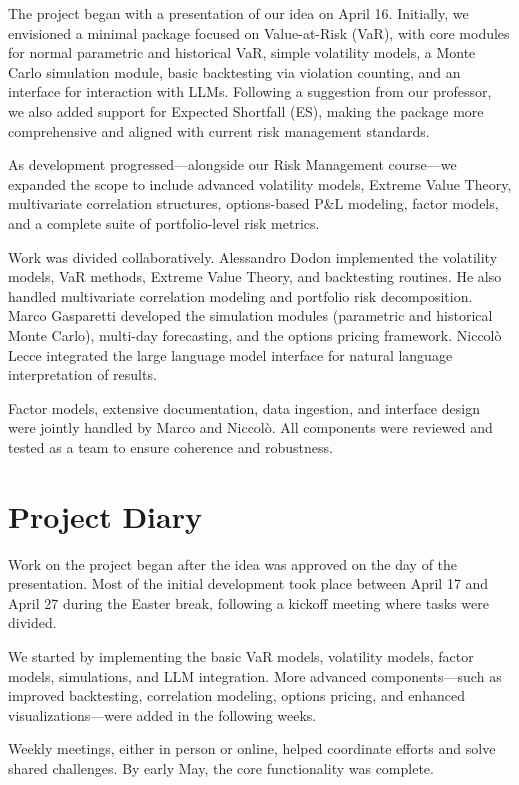 \documentclass{article}
\begin{document}
The project began with a presentation of our idea on April 16. Initially, we envisioned a minimal package focused on Value-at-Risk (VaR), with core modules for normal parametric and historical VaR, simple volatility models, a Monte Carlo simulation module, basic backtesting via violation counting, and an interface for interaction with LLMs. Following a suggestion from our professor, we also added support for Expected Shortfall (ES), making the package more comprehensive and aligned with current risk management standards.

As development progressed—alongside our Risk Management course—we expanded the scope to include advanced volatility models, Extreme Value Theory, multivariate correlation structures, options-based P\&L modeling, factor models, and a complete suite of portfolio-level risk metrics.

Work was divided collaboratively. Alessandro Dodon implemented the volatility models, VaR methods, Extreme Value Theory, and backtesting routines. He also handled multivariate correlation modeling and portfolio risk decomposition. Marco Gasparetti developed the simulation modules (parametric and historical Monte Carlo), multi-day forecasting, and the options pricing framework. Niccolò Lecce integrated the large language model interface for natural language interpretation of results.

Factor models, extensive documentation, data ingestion, and interface design were jointly handled by Marco and Niccolò. All components were reviewed and tested as a team to ensure coherence and robustness.


\section{Project Diary}

Work on the project began after the idea was approved on the day of the presentation. Most of the initial development took place between April 17 and April 27 during the Easter break, following a kickoff meeting where tasks were divided.

We started by implementing the basic VaR models, volatility models, factor models, simulations, and LLM integration. More advanced components—such as improved backtesting, correlation modeling, options pricing, and enhanced visualizations—were added in the following weeks.

Weekly meetings, either in person or online, helped coordinate efforts and solve shared challenges. By early May, the core functionality was complete.
\end{document}
